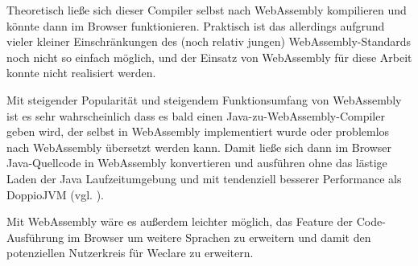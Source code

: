 Theoretisch ließe sich dieser Compiler selbst nach WebAssembly kompilieren und könnte dann im Browser funktionieren. Praktisch ist das allerdings aufgrund vieler kleiner Einschränkungen des (noch relativ jungen) WebAssembly-Standards noch nicht so einfach möglich, und der Einsatz von WebAssembly für diese Arbeit konnte nicht realisiert werden.

Mit steigender Popularität und steigendem Funktionsumfang von WebAssembly ist es sehr wahrscheinlich dass es bald einen Java-zu-WebAssembly-Compiler geben wird, der selbst in WebAssembly implementiert wurde oder problemlos nach WebAssembly übersetzt werden kann. Damit ließe sich dann im Browser Java-Quellcode in WebAssembly konvertieren und ausführen ohne das lästige Laden der Java Laufzeitumgebung und mit tendenziell besserer Performance als DoppioJVM (vgl. \cite{art:wasm_speed}).

Mit WebAssembly wäre es außerdem leichter möglich, das Feature der Code-Ausführung im Browser um weitere Sprachen zu erweitern und damit den potenziellen Nutzerkreis für Weclare zu erweitern.
